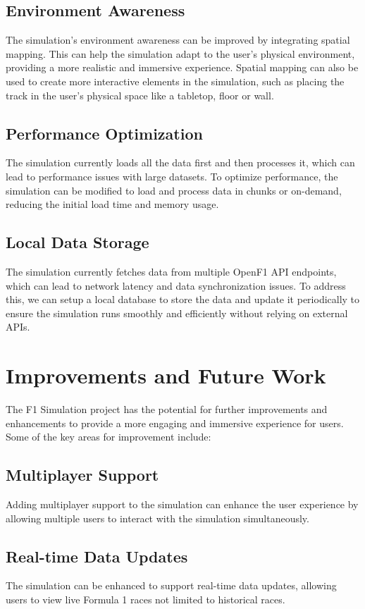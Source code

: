 \documentclass[
	a4paper, %
	10pt, %
	unnumberedsections, %
	twoside, %
]{LTJournalArticle}
\begin{document}
\subsection{Environment Awareness}
The simulation's environment awareness can be improved by integrating spatial mapping. This can help the simulation adapt to the user's physical environment, providing a more realistic and immersive experience. Spatial mapping can also be used to create more interactive elements in the simulation, such as placing the track in the user's physical space like a tabletop, floor or wall.
\subsection{Performance Optimization}
The simulation currently loads all the data first and then processes it, which can lead to performance issues with large datasets. To optimize performance, the simulation can be modified to load and process data in chunks or on-demand, reducing the initial load time and memory usage.

\subsection{Local Data Storage}
The simulation currently fetches data from multiple OpenF1 API endpoints, which can lead to network latency and data synchronization issues. To address this, we can setup a local database to store the data and update it periodically to ensure the simulation runs smoothly and efficiently without relying on external APIs.

\section{Improvements and Future Work}
The F1 Simulation project has the potential for further improvements and enhancements to provide a more engaging and immersive experience for users. Some of the key areas for improvement include:
\subsection{Multiplayer Support}
Adding multiplayer support to the simulation can enhance the user experience by allowing multiple users to interact with the simulation simultaneously. 

\subsection{Real-time Data Updates}
The simulation can be enhanced to support real-time data updates, allowing users to view live Formula 1 races not limited to historical races.
\end{document}
